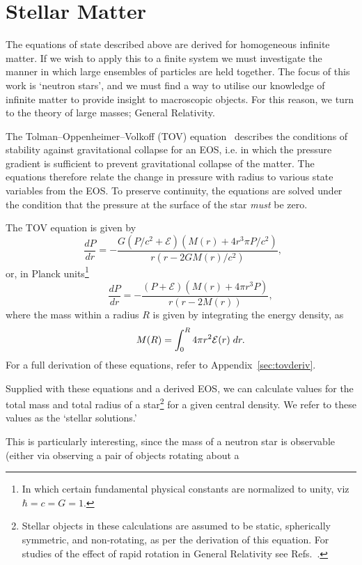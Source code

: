 \documentclass[11pt,a4paper,twoside]{carrollthesis}
\newcommand{\be}{\begin{equation}}
\newcommand{\ee}{\end{equation}}
\begin{document}
\section{Stellar Matter} \label{sec:stellarmatter}
%
The equations of state described above are derived for homogeneous
infinite matter. If we wish to apply this to a finite system we must
investigate the manner in which large ensembles of particles are held
together. The focus of this work is `neutron stars', and we must find
a way to utilise our knowledge of infinite matter to provide insight
to macroscopic objects. For this reason, we turn to the theory of
large masses; General Relativity.\par
%
The Tolman--Oppenheimer--Volkoff (TOV)
equation~\cite{Oppenheimer:1939ne} describes the conditions of
stability against gravitational collapse for an EOS, i.e. in which the
pressure gradient is sufficient to prevent gravitational collapse of
the matter. The equations therefore relate the change in pressure with
radius to various state variables from the EOS. To preserve
continuity, the equations are solved under the condition that the
pressure at the surface of the star \emph{must} be zero.\par
%
The TOV equation is given by
%
\be
\label{eq:TOV:full}
\ \ \frac{dP}{dr}=-\frac{ G \left( P / c^2 +\mathcal{E} \right)
  \left(M(r)+4 r^3 \pi P / c^2 \right)} {r(r-2 G M(r) / c^2)}, \ee
%
or, in Planck units\footnote{In which certain fundamental physical
  constants are normalized to unity, viz $\hbar = c = G = 1$.}
%
\be
\label{eq:TOV:nat}
\qquad \frac{dP}{dr}=-\frac{ \left( P+\mathcal{E} \right) \left(M(r)
  +4 \pi r^{3} P\right)}{r(r -2M(r))}, \ee
%
where the mass within a radius $R$ is given by integrating the energy
density, as
%
\be
\label{eq:TOV:massdef}
\qquad M(R) = \int_0^R 4 \pi r^{2} {\cal E}(r) \; dr.
\ee
%
For a full derivation of these equations, refer to
Appendix~\ref{sec:tovderiv}.\par
%
Supplied with these equations and a derived EOS, we can calculate
values for the total mass and total radius of a star\footnote{Stellar
  objects in these calculations are assumed to be static, spherically
  symmetric, and non-rotating, as per the derivation of this
  equation. For studies of the effect of rapid rotation in General
  Relativity see Refs.~\cite{Lattimer:2004nj,Owen:2005fn}.} for a given
central density. We refer to these values as the `stellar
solutions.'\par
%
This is particularly interesting, since the mass of a neutron star is
observable (either via observing a pair of objects rotating about a
\end{document}
